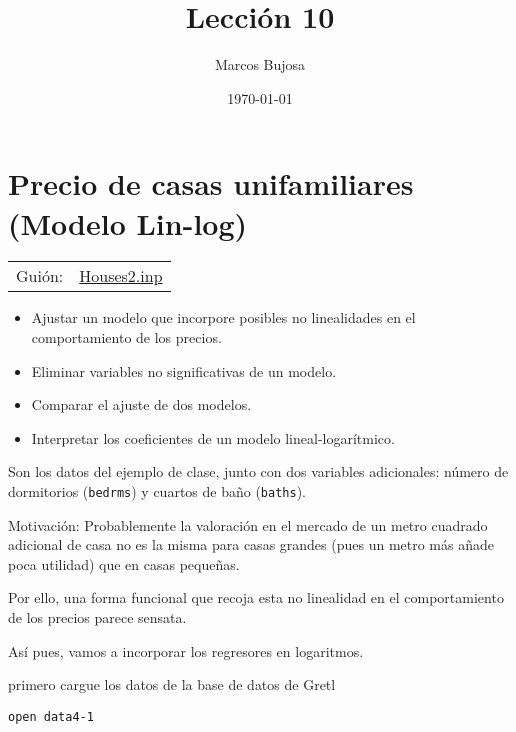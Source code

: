 \documentclass[11pt]{article}
\author{Marcos Bujosa}
\date{\today}
\title{Lección 10}
\begin{document}
\maketitle
\tableofcontents

\clearpage

\section{Precio de casas unifamiliares (Modelo Lin-log)}
\label{sec:org93b157e}
\begin{center}
\begin{tabular}{ll}
Guión: & \href{https://github.com/mbujosab/Ectr/tree/master/Practicas/Gretl/scripts/Houses2.inp}{Houses2.inp}\\
\end{tabular}
\end{center}

\begin{description}
\item[{Objetivo}] \begin{itemize}
\item Ajustar un modelo que incorpore posibles no linealidades en el  comportamiento de los precios.
\item Eliminar variables no significativas de un modelo.
\item Comparar el ajuste de dos modelos.
\item Interpretar los coeficientes de un modelo lineal-logarítmico.
\end{itemize}

\item[{Los datos}] Son los datos del ejemplo de clase, junto con dos
variables adicionales: número de dormitorios (\texttt{bedrms}) y cuartos de
baño (\texttt{baths}).

\item Motivación: Probablemente la valoración en el mercado de un metro
cuadrado adicional de casa no es la misma para casas grandes (pues
un metro más añade poca utilidad) que en casas pequeñas.

Por ello, una forma funcional que recoja esta no linealidad en el
comportamiento de los precios parece sensata.

Así pues, vamos a incorporar los regresores en logaritmos.

\item[{Para empezar}] primero cargue los datos de la base de datos de
Gretl
\begin{verbatim}
open data4-1
\end{verbatim}
\end{description}
\end{document}
